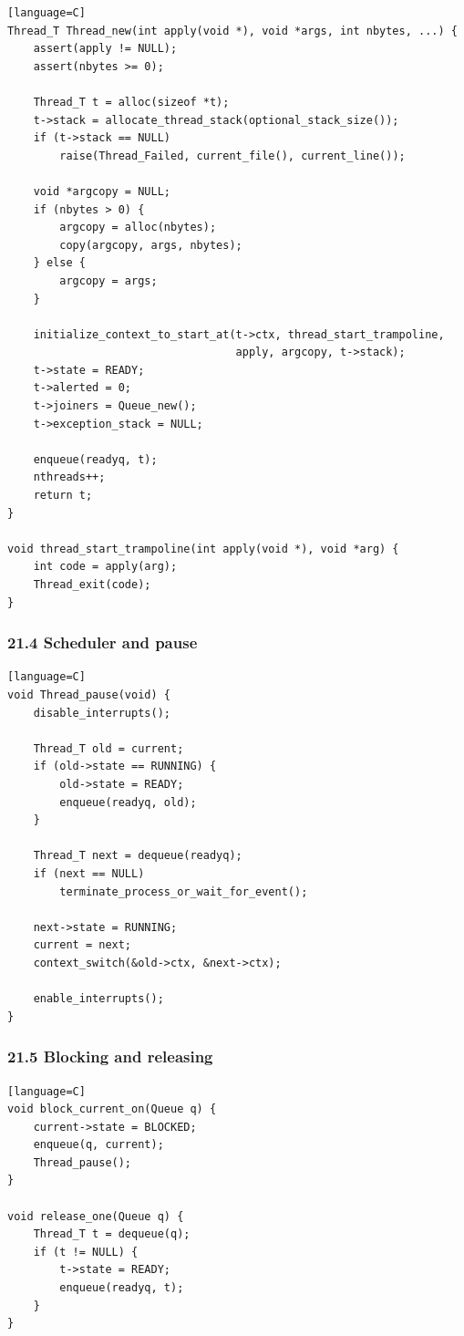 \documentclass[11pt]{article}
\begin{document}
\begin{verbatim}[language=C]
Thread_T Thread_new(int apply(void *), void *args, int nbytes, ...) {
    assert(apply != NULL);
    assert(nbytes >= 0);

    Thread_T t = alloc(sizeof *t);
    t->stack = allocate_thread_stack(optional_stack_size());
    if (t->stack == NULL)
        raise(Thread_Failed, current_file(), current_line());

    void *argcopy = NULL;
    if (nbytes > 0) {
        argcopy = alloc(nbytes);
        copy(argcopy, args, nbytes);
    } else {
        argcopy = args;
    }

    initialize_context_to_start_at(t->ctx, thread_start_trampoline,
                                   apply, argcopy, t->stack);
    t->state = READY;
    t->alerted = 0;
    t->joiners = Queue_new();
    t->exception_stack = NULL;

    enqueue(readyq, t);
    nthreads++;
    return t;
}

void thread_start_trampoline(int apply(void *), void *arg) {
    int code = apply(arg);
    Thread_exit(code);
}
\end{verbatim}

\subsubsection{21.4 Scheduler and pause}\label{scheduler-and-pause}

\begin{verbatim}[language=C]
void Thread_pause(void) {
    disable_interrupts();

    Thread_T old = current;
    if (old->state == RUNNING) {
        old->state = READY;
        enqueue(readyq, old);
    }

    Thread_T next = dequeue(readyq);
    if (next == NULL)
        terminate_process_or_wait_for_event();

    next->state = RUNNING;
    current = next;
    context_switch(&old->ctx, &next->ctx);

    enable_interrupts();
}
\end{verbatim}

\subsubsection{21.5 Blocking and releasing}\label{blocking-and-releasing}

\begin{verbatim}[language=C]
void block_current_on(Queue q) {
    current->state = BLOCKED;
    enqueue(q, current);
    Thread_pause();
}

void release_one(Queue q) {
    Thread_T t = dequeue(q);
    if (t != NULL) {
        t->state = READY;
        enqueue(readyq, t);
    }
}
\end{verbatim}
\end{document}
